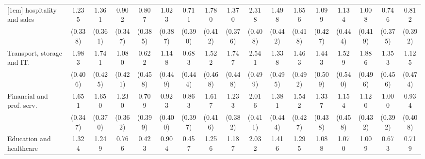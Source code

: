 {\begin{tabular}{l*{16}{c}}
[1em]
hospitality and sales&       1.235\sym{***}&       1.361\sym{***}&       0.902\sym{**} &       0.807\sym{*}  &       1.023\sym{**} &       0.711         &       1.780\sym{***}&       1.370\sym{***}&       2.318\sym{***}&       1.498\sym{***}&       1.656\sym{***}&       1.099\sym{*}  &       1.134\sym{*}  &       1.008\sym{*}  &       0.746\sym{*}  &       0.812\sym{*}  \\
                    &     (0.338)         &     (0.361)         &     (0.347)         &     (0.385)         &     (0.387)         &     (0.390)         &     (0.412)         &     (0.376)         &     (0.408)         &     (0.442)         &     (0.418)         &     (0.427)         &     (0.444)         &     (0.419)         &     (0.375)         &     (0.392)         \\
[1em]
Transport, storage and IT.&       1.983\sym{***}&       1.741\sym{***}&       1.080\sym{*}  &       0.622         &       1.148\sym{*}  &       0.683         &       1.522\sym{**} &       1.747\sym{***}&       2.541\sym{***}&       1.338\sym{**} &       1.463\sym{**} &       1.443\sym{**} &       1.529\sym{**} &       1.886\sym{***}&       1.353\sym{**} &       1.125\sym{*}  \\
                    &     (0.406)         &     (0.425)         &     (0.421)         &     (0.458)         &     (0.449)         &     (0.444)         &     (0.468)         &     (0.448)         &     (0.499)         &     (0.495)         &     (0.492)         &     (0.509)         &     (0.540)         &     (0.496)         &     (0.456)         &     (0.474)         \\
[1em]
Financial and prof. serv.&       1.651\sym{***}&       1.650\sym{***}&       1.230\sym{***}&       0.709         &       0.923\sym{*}  &       0.863\sym{*}  &       1.617\sym{***}&       1.233\sym{**} &       2.016\sym{***}&       1.381\sym{**} &       1.542\sym{***}&       1.337\sym{**} &       1.154\sym{*}  &       1.120\sym{**} &       1.000\sym{*}  &       0.934\sym{*}  \\
                    &     (0.347)         &     (0.370)         &     (0.362)         &     (0.399)         &     (0.400)         &     (0.397)         &     (0.416)         &     (0.382)         &     (0.411)         &     (0.444)         &     (0.427)         &     (0.438)         &     (0.458)         &     (0.432)         &     (0.392)         &     (0.408)         \\
[1em]
Education and healthcare&       1.324\sym{***}&       1.249\sym{***}&       0.766\sym{*}  &       0.423         &       0.904\sym{*}  &       0.457         &       1.256\sym{**} &       1.187\sym{**} &       2.032\sym{***}&       1.416\sym{**} &       1.295\sym{**} &       1.088\sym{*}  &       1.070\sym{*}  &       1.009\sym{*}  &       0.673         &       0.719         \\

\end{tabular}}
